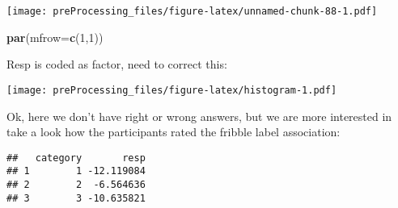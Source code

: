 \documentclass[
]{article}
\newenvironment{Shaded}{\begin{snugshade}}{\end{snugshade}}
\newcommand{\DataTypeTok}[1]{\textcolor[rgb]{0.13,0.29,0.53}{#1}}
\newcommand{\DecValTok}[1]{\textcolor[rgb]{0.00,0.00,0.81}{#1}}
\newcommand{\KeywordTok}[1]{\textcolor[rgb]{0.13,0.29,0.53}{\textbf{#1}}}
\newcommand{\NormalTok}[1]{#1}
\newcommand{\OperatorTok}[1]{\textcolor[rgb]{0.81,0.36,0.00}{\textbf{#1}}}
\newcommand{\StringTok}[1]{\textcolor[rgb]{0.31,0.60,0.02}{#1}}
\begin{document}
\texttt{[image: preProcessing\_files/figure-latex/unnamed-chunk-88-1.pdf]}

\begin{Shaded}
\begin{Highlighting}[]
\KeywordTok{par}\NormalTok{(}\DataTypeTok{mfrow=}\KeywordTok{c}\NormalTok{(}\DecValTok{1}\NormalTok{,}\DecValTok{1}\NormalTok{))}
\end{Highlighting}
\end{Shaded}

Resp is coded as factor, need to correct this:

\begin{Shaded}
\end{Shaded}

\begin{Shaded}
\end{Shaded}

\texttt{[image: preProcessing\_files/figure-latex/histogram-1.pdf]}

Ok, here we don't have right or wrong answers, but we are more
interested in take a look how the participants rated the fribble label
association:

\begin{Shaded}
\end{Shaded}

\begin{verbatim}
##   category       resp
## 1        1 -12.119084
## 2        2  -6.564636
## 3        3 -10.635821
\end{verbatim}
\end{document}
